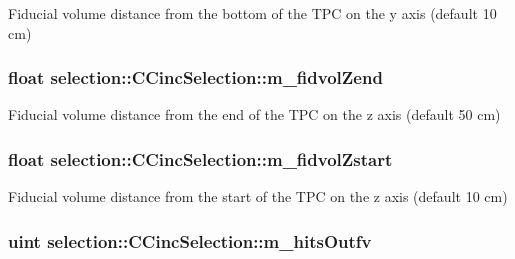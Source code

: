 Fiducial volume distance from the bottom of the T\-P\-C on the y axis (default 10 cm) \hypertarget{classselection_1_1CCincSelection_a2510a29ed7584b2d56eb8dff636ceee6}{
\subsubsection[{m\-\_\-fidvol\-Zend}]{\setlength{\rightskip}{0pt plus 5cm}float selection\-::\-C\-Cinc\-Selection\-::m\-\_\-fidvol\-Zend\hspace{0.3cm}{\ttfamily [private]}}}\label{classselection_1_1CCincSelection_a2510a29ed7584b2d56eb8dff636ceee6}
Fiducial volume distance from the end of the T\-P\-C on the z axis (default 50 cm) \hypertarget{classselection_1_1CCincSelection_a291cc5986c0861bf1883ec1c41457afd}{
\subsubsection[{m\-\_\-fidvol\-Zstart}]{\setlength{\rightskip}{0pt plus 5cm}float selection\-::\-C\-Cinc\-Selection\-::m\-\_\-fidvol\-Zstart\hspace{0.3cm}{\ttfamily [private]}}}\label{classselection_1_1CCincSelection_a291cc5986c0861bf1883ec1c41457afd}
Fiducial volume distance from the start of the T\-P\-C on the z axis (default 10 cm) \hypertarget{classselection_1_1CCincSelection_ac839d87e0a429876df355fee2a561e60}{
\subsubsection[{m\-\_\-hits\-Outfv}]{\setlength{\rightskip}{0pt plus 5cm}uint selection\-::\-C\-Cinc\-Selection\-::m\-\_\-hits\-Outfv\hspace{0.3cm}{\ttfamily [private]}}}\label{classselection_1_1CCincSelection_ac839d87e0a429876df355fee2a561e60}

